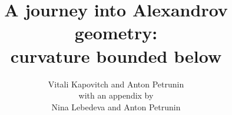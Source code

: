 \documentclass[twoside]{book}
\newcommand{\spell}[2]{#2} %
\def\thetitle{A journey into Alexandrov geometry:\\
curvature bounded below}
\def\theauthors{Vitali Kapovitch and Anton Petrunin}
\begin{document}
\spell{\pagestyle{empty}\renewcommand\includegraphics[2][{}]{}\def\emph{\textit}\renewcommand\footnote[1]{\ (#1)}\renewcommand\z{}\renewcommand\section[1]{SECTION. {#1} SECTION.}}{}

\frontmatter
\title{\thetitle}
\author{\theauthors\\
with an appendix by\\
Nina Lebedeva and Anton Petrunin}
\date{}
\maketitle
\thispagestyle{empty}

\mainmatter
\newpage
\tableofcontents





%











%




%

\backmatter



{


\def\emph{\textit}

\printbibliography[heading=bibintoc]
\fussy
}
\end{document}

